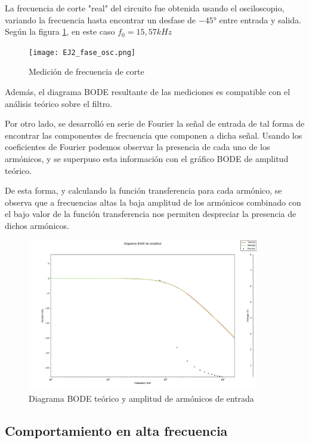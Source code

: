 La frecuencia de corte "real" del circuito fue obtenida usando el osciloscopio, variando la frecuencia hasta encontrar un desfase de $-45°$ entre entrada y salida. Seg\'un la figura \ref{fig:phase_2}, en este caso $f_{0}=15,57kHz$


\begin{figure}[h!]
    \centering
    \texttt{[image: EJ2\_fase\_osc.png]}
    \caption{Medici\'on de frecuencia de corte}
    \label{fig:phase_2} 
\end{figure}
Adem\'as, el diagrama BODE resultante de las mediciones es compatible con el an\'alisis te\'orico sobre el filtro.

Por otro lado, se desarroll\'o en serie de Fourier la se\~nal de entrada de tal forma de encontrar las componentes de frecuencia que componen a dicha se\~nal. Usando los coeficientes de Fourier podemos observar la presencia de cada uno de los arm\'onicos, y se superpuso esta informaci\'on con el gr\'afico BODE de amplitud teórico.

De esta forma, y calculando la funci\'on transferencia para cada arm\'onico, se observa que a frecuencias altas la baja amplitud de los arm\'onicos combinado con el bajo valor de la funci\'on transferencia nos permiten despreciar la presencia de dichos arm\'onicos.

\begin{figure}[h!]
    \centering
    \includegraphics[width=0.9\textwidth]{EJ2_BODE_teorico.png}
    \caption{Diagrama BODE te\'orico y amplitud de arm\'onicos de entrada}
    \label{fig:bode_amp_superp_2} 
\end{figure}

\subsection{Comportamiento en alta frecuencia}


